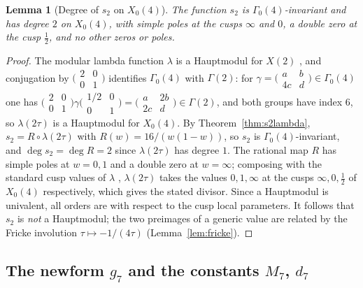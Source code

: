 \documentclass[11pt]{article}
\newtheorem{lemma}[theorem]{Lemma}
\theoremstyle{definition}
\theoremstyle{remark}
\begin{document}
\begin{lemma}[Degree of $s_2$ on $X_0(4)$]\label{rem:deg2}
The function $s_2$ is $\Gamma_0(4)$-invariant and has degree $2$ on
$X_0(4)$, with simple poles at the cusps $\infty$ and $0$, a double
zero at the cusp $\tfrac12$, and no other zeros or poles.
\end{lemma}
\begin{proof}
The modular lambda function $\lambda$ is a Hauptmodul for $X(2)$
\cite{DS}, and conjugation by
$\bigl(\begin{smallmatrix}2&0\\0&1\end{smallmatrix}\bigr)$ identifies
$\Gamma_0(4)$ with $\Gamma(2)$: for
$\gamma=\bigl(\begin{smallmatrix}a&b\\4c&d\end{smallmatrix}\bigr)
\in\Gamma_0(4)$ one has
$\bigl(\begin{smallmatrix}2&0\\0&1\end{smallmatrix}\bigr)\gamma
 \bigl(\begin{smallmatrix}1/2&0\\0&1\end{smallmatrix}\bigr)
=\bigl(\begin{smallmatrix}a&2b\\2c&d\end{smallmatrix}\bigr)\in\Gamma(2)$,
and both groups have index $6$, so $\lambda(2\tau)$ is a Hauptmodul for
$X_0(4)$. By Theorem~\ref{thm:s2lambda}, $s_2=R\circ\lambda(2\tau)$
with $R(w)=16/(w(1-w))$, so $s_2$ is $\Gamma_0(4)$-invariant, and
$\deg s_2=\deg R=2$ since $\lambda(2\tau)$ has degree $1$. The rational
map $R$ has simple poles at $w=0,1$ and a double zero at $w=\infty$;
composing with the standard cusp values of $\lambda$ \cite{DS},
$\lambda(2\tau)$ takes the values $0,1,\infty$ at the cusps
$\infty,0,\tfrac12$ of $X_0(4)$ respectively, which gives the stated
divisor. Since a Hauptmodul is univalent, all orders are with respect
to the cusp local parameters. It follows that $s_2$ is \emph{not} a
Hauptmodul; the two preimages of a generic value are related by the
Fricke involution $\tau\mapsto-1/(4\tau)$ (Lemma~\ref{lem:fricke}).
\end{proof}

\subsection{The newform \texorpdfstring{$g_7$}{g7} and the constants \texorpdfstring{$M_7$, $d_7$}{M7, d7}}\label{subsec:g7}
\end{document}
